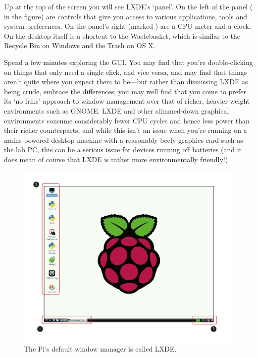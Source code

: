 Up at the top of the screen you will see LXDE's `panel'. On the left of the panel (\protect{} in the figure) are controls that give you access to various applications, tools and system preferences. On the panel's right (marked \protect{}) are a CPU meter and a clock. On the desktop itself is a shortcut to the Wastebasket, which is similar to the Recycle Bin on Windows and the Trash on OS X.

Spend a few minutes exploring the GUI. You may find that you're double-clicking on things that only need a single click, and vice versa, and may find that things aren't quite where you expect them to be---but rather than dismissing LXDE as being crude, embrace the differences; you may well find that you come to prefer its `no frills' approach to window management over that of richer, heavier-weight environments such as GNOME. LXDE and other slimmed-down graphical environments consume considerably fewer CPU cycles and hence less power than their richer counterparts, and while this isn't an issue when you're running on a mains-powered desktop machine with a reasonably beefy graphics card such as the lab PC, this can be a serious issue for devices running off batteries (and it does mean of course that LXDE is rather more environmentally friendly!)

\begin{figure}
\centerline{\includegraphics[width=14cm]{images/lxde-desktop}}
\caption{The Pi's default window manager is called LXDE.}\label{figure:lxde-desktop}
\end{figure}

